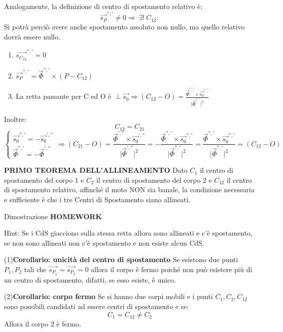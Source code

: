 \documentclass{article}
\begin{document}
\begin{adjustwidth}{2in}{}
Analogamente, la definizione di centro di spostamento relativo è: 
\[
\vec{s_P}^{'', '} \ne 0 \Rightarrow ~ \exists! ~ C_{12} :
\]
Si potrà perciò avere anche spostamento assoluto non nullo, ma quello relativo dovrà essere nullo. 
\begin{enumerate} 
	\item $\vec{s_{C_{12}}}^{'','} = 0$
	\item $\vec{s_P}^{'','} = \vec{\Phi}^{'','} \times (P-C_{12})$
	\item La retta passante per C ed O è $\perp \vec{s_0} \Rightarrow (C_{12}-O) = \frac{\vec{\Phi}^{'','} \times \vec{s_0}^{'','}}{\vert\vec{\Phi}^{'','}\vert^2} $
\end{enumerate}
Inoltre: 
\[
C_{12} = C_{21}
\]
 \[
 \begin{cases}
\vec{s_0}^{'','} = -\vec{s_0}^{',''} \\
\vec{\Phi}^{'','} = - \vec{\Phi}^{',''}
 \end{cases} \Rightarrow (C_{21}-O) = \frac{\vec{\Phi}^{',''} \times \vec{s_0}^{',''}}{\vert\vec{\Phi}^{',''}\vert^2} = - \frac{\vec{\Phi}^{'','} \times \vec{s_0}^{'','}}{\vert\vec{\Phi}^{'','}\vert^2} = \frac{\vec{\Phi}^{'','} \times \vec{s_0}^{'','}}{\vert\vec{\Phi}^{'','}\vert^2} = (C_{12}-O) 
 \] \newline

\textbf{PRIMO TEOREMA DELL'ALLINEAMENTO} \newline
Dato $C_1$ il centro di spostamento del corpo 1 e $C_2$ il centro di spostamento del corpo 2 e $C_{12}$ il centro di spostamento relativo, affinché il moto NON sia banale, la condizione necessaria e sufficiente è che i tre Centri di Spostamento siano allineati.

Dimostrazione \textbf{HOMEWORK}

Hint: Se i CdS giacciono sulla stessa retta allora sono allineati e c'è spostamento, se non sono allineati non c'è spostamento e non esiste alcun CdS.

(1)\textbf{Corollario: unicità del centro di spostamento} \newline
Se esistono due punti $P_1, P_2$ tali che $\vec{s_{P_1}} = \vec{s_{P_2}} = 0$ allora il corpo è fermo poiché non può esistere più di un centro di spostamento, difatti, se esso esiste, è unico. \newline

(2)\textbf{Corollario: corpo fermo} \newline
Se si hanno due corpi mobili e i punti $C_1, C_2, C_{12}$ sono possibili candidati ad essere centri di spostamento e se: 
\[
C_1 = C_{12} \ne C_2
\]
Allora il corpo 2 è fermo.


\end{adjustwidth}
\end{document}
